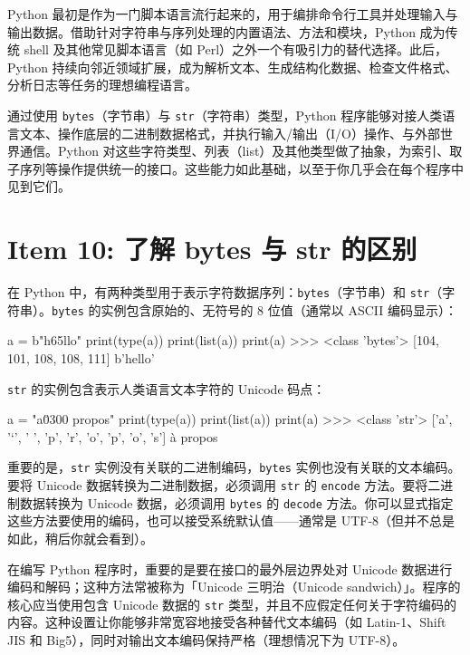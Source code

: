 Python 最初是作为一门脚本语言流行起来的，用于编排命令行工具并处理输入与输出数据。借助针对字符串与序列处理的内置语法、方法和模块，Python 成为传统 shell 及其他常见脚本语言（如 Perl）之外一个有吸引力的替代选择。此后，Python 持续向邻近领域扩展，成为解析文本、生成结构化数据、检查文件格式、分析日志等任务的理想编程语言。

通过使用 \texttt{bytes}（字节串）与 \texttt{str}（字符串）类型，Python 程序能够对接人类语言文本、操作底层的二进制数据格式，并执行输入/输出（I/O）操作、与外部世界通信。Python 对这些字符类型、列表（list）及其他类型做了抽象，为索引、取子序列等操作提供统一的接口。这些能力如此基础，以至于你几乎会在每个程序中见到它们。

\section{Item 10: 了解 bytes 与 str 的区别}

在 Python 中，有两种类型用于表示字符数据序列：\texttt{bytes}（字节串）和 \texttt{str}（字符串）。\texttt{bytes} 的实例包含原始的、无符号的 8 位值（通常以 ASCII 编码显示）：

\begin{codebox}[python]
a = b"h\x65llo"
print(type(a))
print(list(a))
print(a)
>>>
<class 'bytes'>
[104, 101, 108, 108, 111]
b'hello'
\end{codebox}

\texttt{str} 的实例包含表示人类语言文本字符的 Unicode 码点：

\begin{codebox}[python]
a = "a\u0300 propos"
print(type(a))
print(list(a))
print(a)
>>>
<class 'str'>
['a', '`', ' ', 'p', 'r', 'o', 'p', 'o', 's']
à propos
\end{codebox}

重要的是，\texttt{str} 实例没有关联的二进制编码，\texttt{bytes} 实例也没有关联的文本编码。要将 Unicode 数据转换为二进制数据，必须调用 \texttt{str} 的 \texttt{encode} 方法。要将二进制数据转换为 Unicode 数据，必须调用 \texttt{bytes} 的 \texttt{decode} 方法。你可以显式指定这些方法要使用的编码，也可以接受系统默认值——通常是 UTF-8（但并不总是如此，稍后你就会看到）。

在编写 Python 程序时，重要的是要在接口的最外层边界处对 Unicode 数据进行编码和解码；这种方法常被称为「Unicode 三明治（Unicode sandwich）」。程序的核心应当使用包含 Unicode 数据的 \texttt{str} 类型，并且不应假定任何关于字符编码的内容。这种设置让你能够非常宽容地接受各种替代文本编码（如 Latin-1、Shift JIS 和 Big5），同时对输出文本编码保持严格（理想情况下为 UTF-8）。

